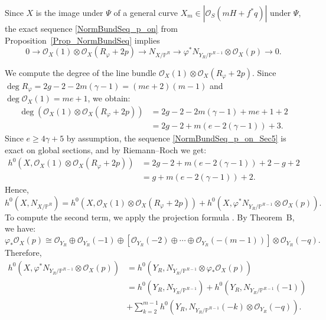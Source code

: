 \documentclass[a4paper,12pt]{amsart}
\begin{document}
Since $X$ is the image under $\Psi$ of a general curve $X_m \in |\mathcal{O}_S (mH + f^{\ast}q)|$ under $\Psi$, the exact sequence \eqref{NormBundSeq_p_on} from \textnormal{Proposition~\ref{Prop_NormBundSeq}} implies
\begin{equation}\label{NormBundSeq_p_on_Sec5}
 0 \to \mathcal{O}_X (1) \otimes \mathcal{O}_X (R_{\varphi}+2p) \to N_{X / \mathbb{P}^R} \to \varphi^{\ast} N_{Y_R / \mathbb{P}^{R-1}} \otimes \mathcal{O}_X (p) \to 0 .
\end{equation}

We compute the degree of the line bundle $\mathcal{O}_X (1) \otimes \mathcal{O}_X (R_{\varphi}+2p)$. Since $\deg R_{\varphi} = 2g-2 - 2m(\gamma - 1) = (me+2)(m-1)$ and $\deg \mathcal{O}_X (1) = me+1$, we obtain:
\[
 \begin{aligned}
  \deg (\mathcal{O}_X (1) \otimes \mathcal{O}_X (R_{\varphi}+2p))
  & = 2g-2 - 2m(\gamma - 1) + me + 1 + 2 \\
  & = 2g-2 + m (e - 2(\gamma - 1)) + 3 .
 \end{aligned}
\]
Since $e \geq 4\gamma + 5$ by assumption, the sequence \eqref{NormBundSeq_p_on_Sec5} is exact on global sections, and by Riemann–Roch we get:
\[
 \begin{aligned}
  h^0 (X, \mathcal{O}_X (1) \otimes \mathcal{O}_X (R_{\varphi}+2p))
  & = 2g-2 + m (e - 2(\gamma - 1)) + 2 - g + 2 \\
  & = g + m (e - 2(\gamma - 1)) + 2 .
 \end{aligned}
\]
Hence,
\[
 h^0 (X, N_{X / \mathbb{P}^R}) = h^0 (X, \mathcal{O}_X (1) \otimes \mathcal{O}_X (R_{\varphi}+2p)) +   h^0 (X, \varphi^{\ast} N_{Y_R / \mathbb{P}^{R-1}} \otimes \mathcal{O}_X (p)) .
\]
To compute the second term, we apply the projection formula \cite[Ex.~III.8.2, p.252]{Hart77}. By \textnormal{Theorem~B}, we have:
\[
 \varphi_{\ast} \mathcal{O}_X (p) \cong \mathcal{O}_{Y_R} \oplus \mathcal{O}_{Y_R} (-1) \oplus \left[ \mathcal{O}_{Y_R} (-2) \oplus \cdots \oplus \mathcal{O}_{Y_R} (-(m-1)) \right] \otimes \mathcal{O}_{Y_R} (-q) .
\]
Therefore,
\[
\begin{aligned}
 h^0 (X, \varphi^{\ast} N_{Y_R / \mathbb{P}^{R-1}} \otimes \mathcal{O}_X (p)) & = h^0 (Y_R, N_{Y_R / \mathbb{P}^{R-1}} \otimes \varphi_{\ast} \mathcal{O}_X (p)) \\
 & = h^0 (Y_R, N_{Y_R / \mathbb{P}^{R-1}}) + h^0 (Y_R, N_{Y_R / \mathbb{P}^{R-1}}(-1)) \\
 & + \sum^{m-1}_{k=2} h^0 (Y_R, N_{Y_R / \mathbb{P}^{R-1}}(-k) \otimes \mathcal{O}_{Y_R} (-q)) .
\end{aligned}
\]
\end{document}
